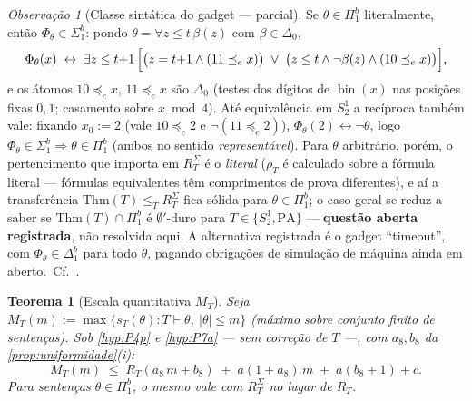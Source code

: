 \documentclass[11pt,a4paper]{article}
\newtheorem{theorem}{Teorema}[section]
\theoremstyle{definition}
\theoremstyle{remark}
\newtheorem*{remark}{Observação}
\begin{document}
\begin{remark}[Classe sintática do gadget --- parcial]\label{rem:classe}
Se $\theta \in \Pi^{b}_{1}$ literalmente, então $\Phi_\theta \in \Sigma^{b}_{1}$:
pondo $\theta = \forall z \leq t\, \beta(z)$ com $\beta \in \Delta_{0}$,
\begin{equation}\label{eq:classe}
  \Phi_\theta(x) \;\leftrightarrow\; \exists z \leq t{+}1\,
  \Bigl[ \bigl(z = t{+}1 \wedge (11 \preceq_{e} x)\bigr)
  \;\vee\; \bigl(z \leq t \wedge \neg\beta(z) \wedge (10 \preceq_{e} x)\bigr)
  \Bigr],
\end{equation}
e os átomos $10 \preceq_{e} x$, $11 \preceq_{e} x$ são $\Delta_{0}$ (testes
dos dígitos de $\operatorname{bin}(x)$ nas posições fixas $0,1$; casamento
sobre $x \bmod 4$). Até equivalência em $S^{1}_{2}$ a recíproca também vale:
fixando $x_{0} := 2$ (vale $10 \preceq_{e} 2$ e $\neg(11 \preceq_{e} 2)$),
$\Phi_\theta(2) \leftrightarrow \neg\theta$, logo
$\Phi_\theta \in \Sigma^{b}_{1} \Rightarrow \theta \in \Pi^{b}_{1}$
(ambos no sentido \emph{representável}). Para $\theta$ arbitrário, porém, o
pertencimento que importa em $R^{\Sigma}_T$ é o \emph{literal} ($\rho_T$ é
calculado sobre a fórmula literal --- fórmulas equivalentes têm comprimentos
de prova diferentes), e aí a transferência
$\mathrm{Thm}(T) \leq_{T} R^{\Sigma}_T$ fica sólida para
$\theta \in \Pi^{b}_{1}$; o caso geral se reduz a saber se
$\mathrm{Thm}(T) \cap \Pi^{b}_{1}$ é $\emptyset'$-duro para
$T \in \{S^{1}_{2}, \mathrm{PA}\}$ --- \textbf{questão aberta registrada},
não resolvida aqui. A alternativa registrada é o gadget ``timeout'', com
$\Phi_\theta \in \Delta^{b}_{1}$ para todo $\theta$, pagando obrigações de
simulação de máquina ainda em aberto.\ Cf.\ \cite{Krajicek2025}.
\end{remark}

\begin{theorem}[Escala quantitativa $M_T$]\label{thm:escala}
Seja
$M_T(m) := \max\{ s_T(\theta) : T \vdash \theta,\ \lvert\theta\rvert \leq m \}$
(máximo sobre conjunto finito de sentenças). Sob \cref{hyp:P4p} e
\cref{hyp:P7a} --- \emph{sem} correção de $T$ ---, com $a_{8}, b_{8}$ da
\cref{prop:uniformidade}(i):
\begin{equation}\label{eq:escala}
  M_T(m) \;\leq\; R_T(a_{8}\, m + b_{8}) \;+\; a(1 + a_{8})\,m
  \;+\; a(b_{8}+1) + c .
\end{equation}
Para sentenças $\theta \in \Pi^{b}_{1}$, o mesmo vale com $R^{\Sigma}_T$ no
lugar de $R_T$.
\end{theorem}
\end{document}
